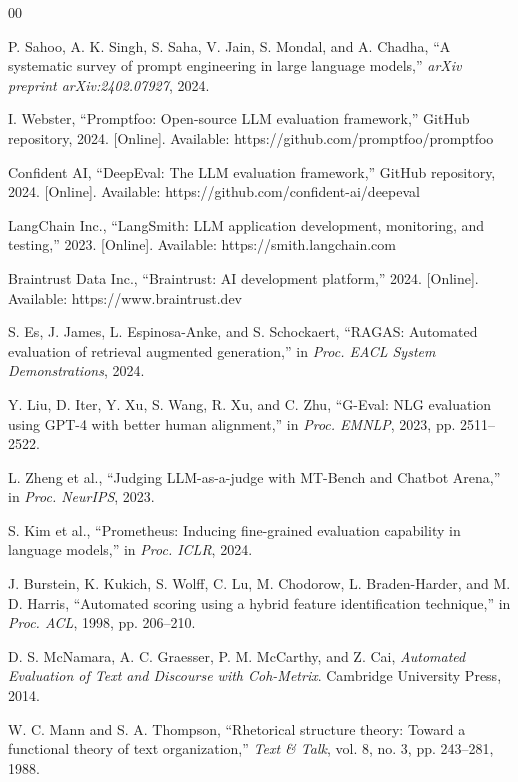 \documentclass[conference]{IEEEtran}
\begin{document}
\begin{thebibliography}{00}

 P. Sahoo, A. K. Singh, S. Saha, V. Jain, S. Mondal, and A. Chadha, ``A systematic survey of prompt engineering in large language models,'' \emph{arXiv preprint arXiv:2402.07927}, 2024.

 I. Webster, ``Promptfoo: Open-source LLM evaluation framework,'' GitHub repository, 2024. [Online]. Available: https://github.com/promptfoo/promptfoo

 Confident AI, ``DeepEval: The LLM evaluation framework,'' GitHub repository, 2024. [Online]. Available: https://github.com/confident-ai/deepeval

 LangChain Inc., ``LangSmith: LLM application development, monitoring, and testing,'' 2023. [Online]. Available: https://smith.langchain.com

 Braintrust Data Inc., ``Braintrust: AI development platform,'' 2024. [Online]. Available: https://www.braintrust.dev

 S. Es, J. James, L. Espinosa-Anke, and S. Schockaert, ``RAGAS: Automated evaluation of retrieval augmented generation,'' in \emph{Proc. EACL System Demonstrations}, 2024.

 Y. Liu, D. Iter, Y. Xu, S. Wang, R. Xu, and C. Zhu, ``G-Eval: NLG evaluation using GPT-4 with better human alignment,'' in \emph{Proc. EMNLP}, 2023, pp. 2511--2522.

 L. Zheng et al., ``Judging LLM-as-a-judge with MT-Bench and Chatbot Arena,'' in \emph{Proc. NeurIPS}, 2023.

 S. Kim et al., ``Prometheus: Inducing fine-grained evaluation capability in language models,'' in \emph{Proc. ICLR}, 2024.

 J. Burstein, K. Kukich, S. Wolff, C. Lu, M. Chodorow, L. Braden-Harder, and M. D. Harris, ``Automated scoring using a hybrid feature identification technique,'' in \emph{Proc. ACL}, 1998, pp. 206--210.

 D. S. McNamara, A. C. Graesser, P. M. McCarthy, and Z. Cai, \emph{Automated Evaluation of Text and Discourse with Coh-Metrix}. Cambridge University Press, 2014.

 W. C. Mann and S. A. Thompson, ``Rhetorical structure theory: Toward a functional theory of text organization,'' \emph{Text \& Talk}, vol. 8, no. 3, pp. 243--281, 1988.


\end{thebibliography}
\end{document}
